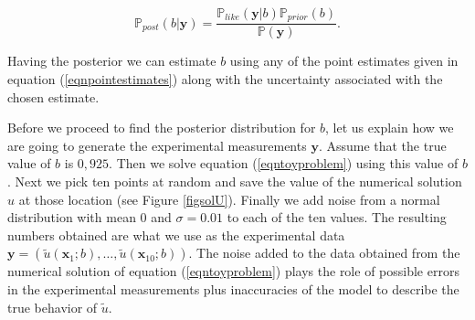 \documentclass[12pt]{book}
\newcommand{\post}{\mathbb{P}_{post}}
\newcommand{\like}{\mathbb{P}_{like}}
\newcommand{\prior}{\mathbb{P}_{prior}}
\newcommand{\p}{\mathbb{P}}
\newcommand{\x}{\textbf{x}}
\newcommand{\y}{\textbf{y}}
\begin{document}
\begin{equation} \label{eqnpropto}
\post(b|\y)=\frac{\like(\y|b)\prior(b)}{\p(\y)}.
\end{equation}

Having the posterior we can estimate $b$ using any of the point estimates given in equation (\ref{eqnpointestimates}) along
with the  uncertainty associated with the chosen estimate.

Before we proceed  to find the posterior distribution for $b$, let us explain how we are going to generate the experimental measurements $\y$. 
Assume that the true value of $b$ is $0,925$. Then we solve equation (\ref{eqntoyproblem})
using this value of $b$. Next we pick  ten points at random  and save the value of the numerical 
solution $u$ at those location (see Figure \ref{figsolU}).  Finally we add  noise from
a normal distribution with mean $0$ and $\sigma=0.01$ to each  of the ten values. The resulting numbers obtained are what we use
as the experimental data $\y=(\tilde{u}(\x_{1};b),\ldots,\tilde{u}(\x_{10};b))$. The noise added to the data obtained from the
numerical  solution of equation
(\ref{eqntoyproblem}) plays the role of possible  errors in the experimental measurements plus inaccuracies of the 
model to describe the true behavior of $\tilde{u}$.
\end{document}
